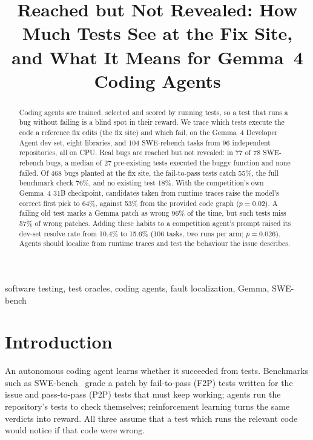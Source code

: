 \documentclass[conference]{IEEEtran}
\begin{document}
\title{Reached but Not Revealed: How Much Tests See at the Fix Site, and What It Means for Gemma~4 Coding Agents}

\author{
}

\maketitle

\begin{abstract}
Coding agents are trained, selected and scored by running tests, so a test that runs a bug without failing is a blind spot in their reward. We trace which tests execute the code a reference fix edits (the fix site) and which fail, on the Gemma~4 Developer Agent dev set, eight libraries, and 104 SWE-rebench tasks from 96 independent repositories, all on CPU. Real bugs are reached but not revealed: in 77 of 78 SWE-rebench bugs, a median of 27 pre-existing tests executed the buggy function and none failed. Of 468 bugs planted at the fix site, the fail-to-pass tests catch 55\%, the full benchmark check 76\%, and no existing test 18\%. With the competition's own Gemma~4 31B checkpoint, candidates taken from runtime traces raise the model's correct first pick to 64\%, against 53\% from the provided code graph ($p=0.02$). A failing old test marks a Gemma patch as wrong 96\% of the time, but such tests miss 57\% of wrong patches. Adding these habits to a competition agent's prompt raised its dev-set resolve rate from 10.4\% to 15.6\% (106 tasks, two runs per arm; $p=0.026$). Agents should localize from runtime traces and test the behaviour the issue describes.
\end{abstract}

\begin{IEEEkeywords}
software testing, test oracles, coding agents, fault localization, Gemma, SWE-bench
\end{IEEEkeywords}

\section{Introduction}
An autonomous coding agent learns whether it succeeded from tests. Benchmarks such as SWE-bench~\cite{jimenez2024swebench} grade a patch by fail-to-pass (F2P) tests written for the issue and pass-to-pass (P2P) tests that must keep working; agents run the repository's tests to check themselves; reinforcement learning turns the same verdicts into reward. All three assume that a test which runs the relevant code would notice if that code were wrong.
\end{document}
